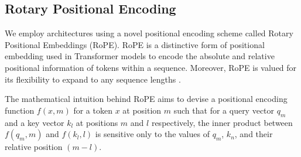 \subsection{Rotary Positional Encoding }

We employ architectures using a novel positional encoding scheme called Rotary Positional Embeddings (RoPE)\cite{Rotaryrope}. RoPE is a distinctive form of positional embedding used in Transformer models to encode the absolute and relative positional information of tokens within a sequence. Moreover, RoPE is valued for its flexibility to expand to any sequence lengths \cite{Rotaryrope}. 

The mathematical intuition behind RoPE aims to devise a positional encoding function $f(x,m)$ for a token $x$ at position $m$ such that for a query vector $q_m$ and a key vector $k_l$ at positions $m$ and $l$ respectively, the inner product between $f(q_m,m)$ and $f(k_l,l)$ is sensitive only to the values of $q_m$, $k_n$, and their relative position $(m-l)$.


